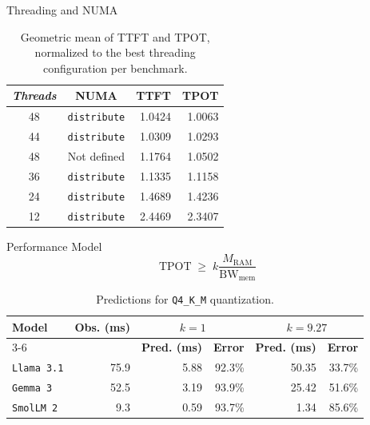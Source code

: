\documentclass[aspectratio=169, handout]{beamer}
\begin{document}
\begin{frame}{Threading and NUMA}
    \begin{table}[h]
        \centering
        \begin{tabular}{|c|c|r|r|}
            \hline
            \textbf{\emph{Threads}} & \textbf{NUMA}       & \textbf{TTFT} & \textbf{TPOT} \\ \hline
                                48 & \texttt{distribute} &        1.0424 &        1.0063 \\ \hline
                                44 & \texttt{distribute} &        1.0309 &        1.0293 \\ \hline
                                48 & Not defined         &        1.1764 &        1.0502 \\ \hline
                                36 & \texttt{distribute} &        1.1335 &        1.1158 \\ \hline
                                24 & \texttt{distribute} &        1.4689 &        1.4236 \\ \hline
                                12 & \texttt{distribute} &        2.4469 &        2.3407 \\ \hline
        \end{tabular}
        \caption{
            Geometric mean of TTFT and TPOT, normalized to the best threading configuration per
            benchmark.
        }
    \end{table}
\end{frame}

\begin{frame}{Performance Model}
    \centering
    $$
        \text{TPOT} \;\geq\; k \frac{M_{\text{RAM}}}{\text{BW}_{\text{mem}}}
    $$


    \vspace{4ex}

    \begin{table}[H]
        \centering
        \begin{tabular}{|l|r|r|r|r|r|}
            \hline
            \multirow{2}{*}{\textbf{Model}}          &
            \multirow{2}{*}{\textbf{Obs. (ms)}}      &
            \multicolumn{2}{c|}{\textbf{$k = 1$}}    &
            \multicolumn{2}{c|}{\textbf{$k = 9.27$}} \\ \cline{3-6}

                                &
                                &
            \textbf{Pred. (ms)} &
            \textbf{Error}      &
            \textbf{Pred. (ms)} &
            \textbf{Error}      \\ \hline

            \texttt{Llama 3.1} & 75.9 & 5.88 & 92.3\% & 50.35 & 33.7\% \\ \hline
            \texttt{Gemma 3}   & 52.5 & 3.19 & 93.9\% & 25.42 & 51.6\% \\ \hline
            \texttt{SmolLM 2}  &  9.3 & 0.59 & 93.7\% &  1.34 & 85.6\% \\ \hline
        \end{tabular}
        \caption{Predictions for \texttt{Q4\_K\_M} quantization.}
    \end{table}
\end{frame}
\end{document}

